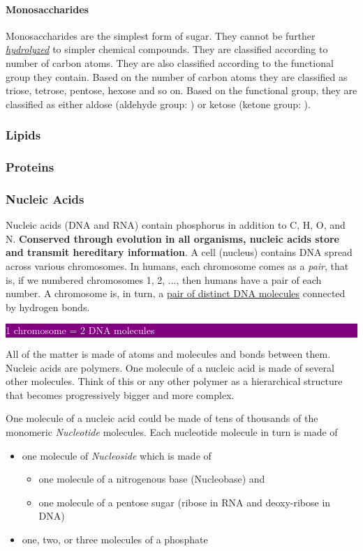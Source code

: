 \documentclass[12pt]{article}
\newcommand{\ctext}[3]{
    \colorbox{#2}{\parbox{0.9\textwidth}{\textcolor{#1}{#3}}}
}
\begin{document}
\paragraph{Monosaccharides}
Monosaccharides are the simplest form of sugar. They cannot be further \hyperref[sec: hydrolysis]{\emph{hydrolyzed}} to simpler chemical compounds. They are classified according to number of carbon atoms. They are also classified according to the functional group they contain. Based on the number of carbon atoms they are classified as triose, tetrose, pentose, hexose and so on. Based on the functional group, they are classified as either aldose (aldehyde group: ) or ketose (ketone group: ).
\subsubsection{Lipids}
\subsubsection{Proteins}
\subsubsection{Nucleic Acids}
Nucleic acids (DNA and RNA) contain phosphorus in addition to C, H, O, and N. \textbf{Conserved through evolution in all organisms, nucleic acids store and transmit hereditary information}. A cell (nucleus) contains DNA spread across various chromosomes. In humans, each chromosome comes as a \emph{pair}, that is, if we numbered chromosomes 1, 2, $\dots$, then humans have a pair of each number. A chromosome is, in turn, a \href{https://biology.stackexchange.com/a/996/63085}{pair of distinct DNA molecules} connected by hydrogen bonds.


\ctext{white}{purple}{
    1 chromosome = 2 DNA molecules
}

All of the matter is made of atoms and molecules and bonds between them. Nucleic acids are polymers. One molecule of a nucleic acid is made of several other molecules. Think of this or any other polymer as a hierarchical structure that becomes progressively bigger and more complex.

One molecule of a nucleic acid could be made of tens of thousands of the monomeric \emph{Nucleotide} molecules. Each nucleotide molecule in turn is made of 
\begin{itemize}
    \item one molecule of \emph{Nucleoside} which is made of
        \begin{itemize}
            \item one molecule of a nitrogenous base (Nucleobase) and
            \item one molecule of a pentose sugar (ribose in RNA and deoxy-ribose in DNA)
        \end{itemize}
    \item one, two, or three molecules of a phosphate 
\end{itemize}
\end{document}
